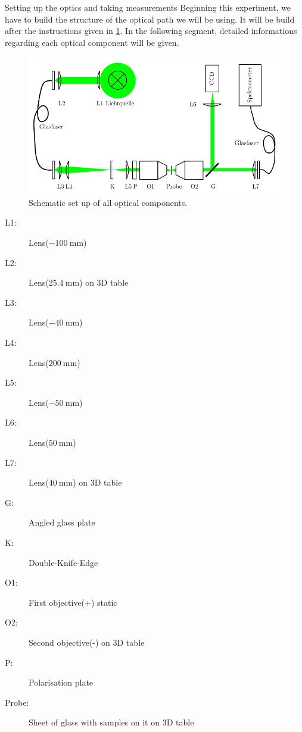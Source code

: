 \documentclass[pdftex, a4paper,11pt, twoside, UKenglish]{report}
\begin{document}
  \begin{chapter}{Setting up the optics and taking measurements}
    \label{chp:Setup}
    Beginning this experiment, we have to build the structure of the optical
    path we will be using. It will be build after the instructions given in
    \cref{fig:Setup}. In the following segment, detailed informations regarding
    each optical component will be given.
    \begin{figure}[hb]
      \centering
      \includegraphics[width=\textwidth]{Figures/Setup.png}
      \caption{Schematic set up of all optical components.\cite{bib:Anleitung}}
      \label{fig:Setup}
    \end{figure}
    \newline
    \begin{minipage}{0.41\textwidth}
      \begin{description}
        \item[L1:] Lens($\SI{-100}{\milli\meter}$)
        \item[L2:] Lens($\SI{+25.4}{\milli\meter}$) on 3D table
        \item[L3:] Lens($\SI{-40}{\milli\meter}$)
        \item[L4:] Lens($\SI{+200}{\milli\meter}$)
        \item[L5:] Lens($\SI{-50}{\milli\meter}$)
        \item[L6:] Lens($\SI{+50}{\milli\meter}$)
        \item[L7:] Lens($\SI{+40}{\milli\meter}$) on 3D table
      \end{description}
    \end{minipage}\quad
    \begin{minipage}{0.55\textwidth}
      \begin{description}
        \item[G:] Angled glass plate
        \item[K:] Double-Knife-Edge
        \item[O1:] First objective(+) static
        \item[O2:] Second objective(-) on 3D table
        \item[P:] Polarisation plate
        \item[Probe:] Sheet of glass with samples on it on 3D table
      \end{description}
    \end{minipage}
    

\end{chapter}
\end{document}
